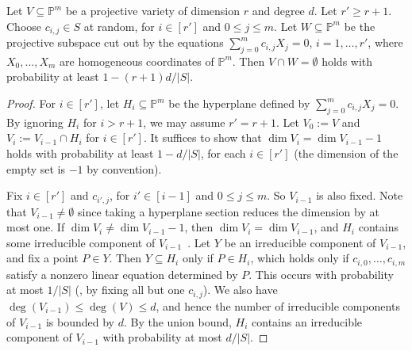 \documentclass{toc}
\newcommand{\proj}{\mathbb{P}}
\begin{document}
\begin{lemma}\label{lem_hyperplane}
Let $V\subseteq\proj^m$ be a projective variety of dimension $r$ and degree $d$. Let $r'\geq r+1$. Choose $c_{i,j}\in S$ at random, for $i\in [r']$ and $0\leq j\leq m$.
Let $W\subseteq \proj^m$ be the projective subspace cut out by the equations $\sum_{j=0}^{m} c_{i,j} X_j=0$, $i=1,\dots,r'$, where $X_0,\dots,X_m$ are homogeneous coordinates of $\proj^m$. Then $V\cap W=\emptyset$ holds with probability at least $1-(r+1)d/|S|$.
\end{lemma}
\begin{proof}
For $i\in [r']$, let $H_i\subseteq \proj^m$ be the hyperplane defined by $\sum_{j=0}^{m} c_{i,j} X_j=0$. By ignoring $H_i$ for $i>r+1$, we may assume $r'=r+1$.  Let $V_0:= V$ and $V_i:= V_{i-1}\cap H_i$ for $i\in [r']$. It suffices to show that $\dim V_i=\dim V_{i-1}-1$ holds with probability at least $1-d/|S|$, for each $i\in [r']$ (the dimension of the empty set is $-1$ by convention). 

Fix $i\in [r']$ and $c_{i',j}$, for $i'\in [i-1]$ and $0\leq j\leq m$. So $V_{i-1}$ is also fixed.  Note that $V_{i-1}\neq \emptyset$ since  taking a hyperplane section reduces the dimension  by at most one. If $\dim V_i\neq \dim V_{i-1}-1$, then $\dim V_i=\dim V_{i-1}$, and $H_i$ contains some irreducible component of $V_{i-1}$~\cite[Exercise~11.6]{Har92}. Let $Y$ be an irreducible component of $V_{i-1}$, and fix a point $P\in Y$. Then $Y\subseteq H_i$ only if $P\in H_i$, which holds only if  $c_{i,0},\dots,c_{i,m}$ satisfy a nonzero linear equation determined by $P$. This occurs with probability at most $1/|S|$ (\eg, by fixing all but one $c_{i,j}$). 
We also have $\deg(V_{i-1})\leq \deg(V)\leq d$, and hence the number of irreducible components of $V_{i-1}$ is bounded by $d$.
By the union bound, $H_i$ contains an irreducible component of $V_{i-1}$ with probability at most $d/|S|$.
\end{proof}
%
%
\end{document}
